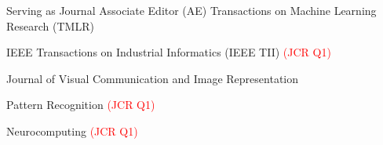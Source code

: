 \begin{rSection}{Serving as Journal Associate Editor (AE)}
Transactions on Machine Learning Research (TMLR)

IEEE Transactions on Industrial Informatics (IEEE TII) \textcolor{red}{(JCR Q1)}

Journal of Visual Communication and Image Representation

Pattern Recognition \textcolor{red}{(JCR Q1)}

Neurocomputing \textcolor{red}{(JCR Q1)}

\end{rSection}
